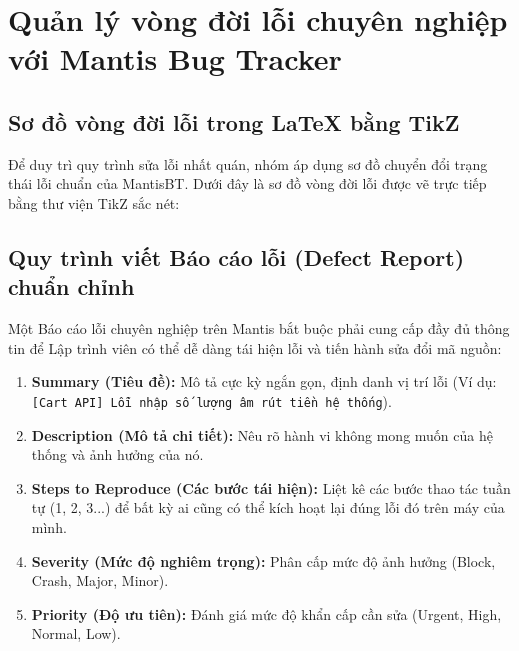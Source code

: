 \section{Quản lý vòng đời lỗi chuyên nghiệp với Mantis Bug Tracker}

\subsection{Sơ đồ vòng đời lỗi trong LaTeX bằng TikZ}
Để duy trì quy trình sửa lỗi nhất quán, nhóm áp dụng sơ đồ chuyển đổi trạng thái lỗi chuẩn của MantisBT. Dưới đây là sơ đồ vòng đời lỗi được vẽ trực tiếp bằng thư viện TikZ sắc nét:

\begin{center}
\end{center}

\subsection{Quy trình viết Báo cáo lỗi (Defect Report) chuẩn chỉnh}
Một Báo cáo lỗi chuyên nghiệp trên Mantis bắt buộc phải cung cấp đầy đủ thông tin để Lập trình viên có thể dễ dàng tái hiện lỗi và tiến hành sửa đổi mã nguồn:
\begin{enumerate}
    \item \textbf{Summary (Tiêu đề):} Mô tả cực kỳ ngắn gọn, định danh vị trí lỗi (Ví dụ: \texttt{[Cart API] Lỗi nhập số lượng âm rút tiền hệ thống}).
    \item \textbf{Description (Mô tả chi tiết):} Nêu rõ hành vi không mong muốn của hệ thống và ảnh hưởng của nó.
    \item \textbf{Steps to Reproduce (Các bước tái hiện):} Liệt kê các bước thao tác tuần tự (1, 2, 3...) để bất kỳ ai cũng có thể kích hoạt lại đúng lỗi đó trên máy của mình.
    \item \textbf{Severity (Mức độ nghiêm trọng):} Phân cấp mức độ ảnh hưởng (Block, Crash, Major, Minor).
    \item \textbf{Priority (Độ ưu tiên):} Đánh giá mức độ khẩn cấp cần sửa (Urgent, High, Normal, Low).
\end{enumerate}

